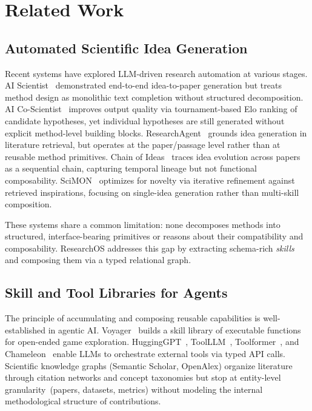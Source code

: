 \section{Related Work}
\label{sec:related}

\subsection{Automated Scientific Idea Generation}
\label{sec:rw_idea_gen}

Recent systems have explored LLM-driven research automation at various stages. AI Scientist~\cite{lu2024aiscientist} demonstrated end-to-end idea-to-paper generation but treats method design as monolithic text completion without structured decomposition. AI Co-Scientist~\cite{gottifredi2024aicoscientist} improves output quality via tournament-based Elo ranking of candidate hypotheses, yet individual hypotheses are still generated without explicit method-level building blocks. ResearchAgent~\cite{baek2024researchagent} grounds idea generation in literature retrieval, but operates at the paper/passage level rather than at reusable method primitives. Chain of Ideas~\cite{li2024chainofideas} traces idea evolution across papers as a sequential chain, capturing temporal lineage but not functional composability. SciMON~\cite{wang2024scimon} optimizes for novelty via iterative refinement against retrieved inspirations, focusing on single-idea generation rather than multi-skill composition.

These systems share a common limitation: none decomposes methods into structured, interface-bearing primitives or reasons about their compatibility and composability. ResearchOS addresses this gap by extracting schema-rich \emph{skills} and composing them via a typed relational graph.

\subsection{Skill and Tool Libraries for Agents}
\label{sec:rw_tools}

The principle of accumulating and composing reusable capabilities is well-established in agentic AI. Voyager~\cite{wang2023voyager} builds a skill library of executable functions for open-ended game exploration. HuggingGPT~\cite{shen2023hugginggpt}, ToolLLM~\cite{qin2023toolllm}, Toolformer~\cite{schick2023toolformer}, and Chameleon~\cite{lu2023chameleon} enable LLMs to orchestrate external tools via typed API calls. Scientific knowledge graphs (Semantic Scholar, OpenAlex) organize literature through citation networks and concept taxonomies but stop at entity-level granularity~(papers, datasets, metrics) without modeling the internal methodological structure of contributions.

